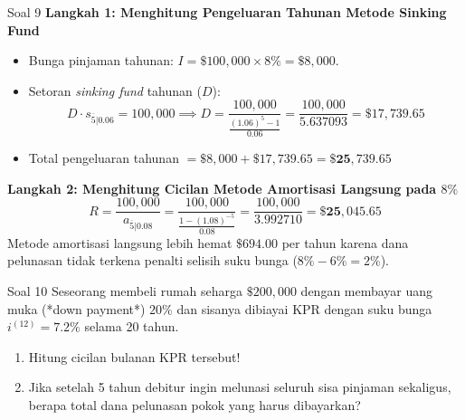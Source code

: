 \documentclass[11pt,a4paper]{article}
\begin{document}
\begin{solutionbox}{Soal 9}
\textbf{Langkah 1: Menghitung Pengeluaran Tahunan Metode Sinking Fund}
\begin{itemize}
    \item Bunga pinjaman tahunan: $I = \$100{,}000 \times 8\% = \$8{,}000$.
    \item Setoran \textit{sinking fund} tahunan ($D$):
    \begin{equation*}
        D \cdot s_{\overline{5}|0.06} = 100{,}000 \implies D = \frac{100{,}000}{\frac{(1.06)^5 - 1}{0.06}} = \frac{100{,}000}{5.637093} = \$17{,}739.65
    \end{equation*}
    \item Total pengeluaran tahunan $= \$8{,}000 + \$17{,}739.65 = \mathbf{\$25{,}739.65}$
\end{itemize}

\textbf{Langkah 2: Menghitung Cicilan Metode Amortisasi Langsung pada $8\%$}
\begin{equation*}
    R = \frac{100{,}000}{a_{\overline{5}|0.08}} = \frac{100{,}000}{\frac{1 - (1.08)^{-5}}{0.08}} = \frac{100{,}000}{3.992710} = \mathbf{\$25{,}045.65}
\end{equation*}
Metode amortisasi langsung lebih hemat $\$694.00$ per tahun karena dana pelunasan tidak terkena penalti selisih suku bunga ($8\% - 6\% = 2\%$).
\end{solutionbox}

\vspace{1.5em}

\begin{problembox}{Soal 10}
Seseorang membeli rumah seharga $\$200{,}000$ dengan membayar uang muka (*down payment*) $20\%$ dan sisanya dibiayai KPR dengan suku bunga $i^{(12)} = 7.2\%$ selama 20 tahun.
\begin{enumerate}[label=(\alph*)]
    \item Hitung cicilan bulanan KPR tersebut!
    \item Jika setelah 5 tahun debitur ingin melunasi seluruh sisa pinjaman sekaligus, berapa total dana pelunasan pokok yang harus dibayarkan?
\end{enumerate}
\end{problembox}
\end{document}
